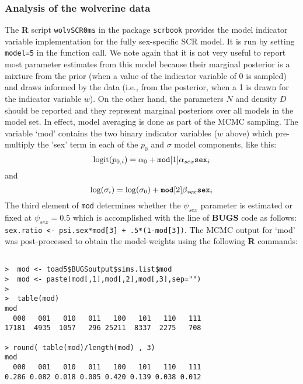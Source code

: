 {\subsubsection{Analysis of the wolverine data}

The {\bf R} script \mbox{\tt wolvSCR0ms} in the package \mbox{\tt scrbook}
provides the model indicator variable implementation for the fully
sex-specific SCR model.  It is run by setting \mbox{\tt model=5} in
the function call. We note again that it is not very useful to report most
parameter estimates from this model because their marginal posterior
is a mixture from the prior (when a value of the indicator variable of
0 is sampled) and draws informed by the data (i.e., from the
posterior, when a 1 is drawn for the indicator variable $w$).
 On the other hand, the parameters
$N$ and density $D$ should be reported and they represent marginal
posteriors over all models in the model set. In effect, model
averaging is done as part of the MCMC sampling.  The variable `mod'
contains the two binary indicator variables ($w$ above) which
pre-multiply the 'sex' term in each of the $p_{0}$ and $\sigma$ model
components, like this:
\[
 \mbox{logit}(p_{0,i}) = \alpha_{0} + \mbox{\tt mod}[1] \alpha_{sex} \mbox{\tt sex}_{i}
\]
and
\[
 \mbox{log}(\sigma_{i}) = \log(\sigma_{0}) + \mbox{\tt mod}[2] \beta_{sex} \mbox{\tt sex}_{i}
\]
The third element of \mbox{\tt mod} determines whether the
$\psi_{sex}$ parameter is estimated or fixed at $\psi_{sex} =
0.5$ which is accomplished with the line of {\bf BUGS} code as
follows:
\newline 
\mbox{\tt sex.ratio <- psi.sex*mod[3] + .5*(1-mod[3])}.
The MCMC output for `mod' was post-processed to obtain the
model-weights using the following  {\bf R} commands:
\begin{verbatim}

>  mod <- toad5$BUGSoutput$sims.list$mod
>  mod <- paste(mod[,1],mod[,2],mod[,3],sep="")
>
>  table(mod)
mod
  000   001   010   011   100   101   110   111
17181  4935  1057   296 25211  8337  2275   708

> round( table(mod)/length(mod) , 3)
mod
  000   001   010   011   100   101   110   111
0.286 0.082 0.018 0.005 0.420 0.139 0.038 0.012


\end{verbatim}}
